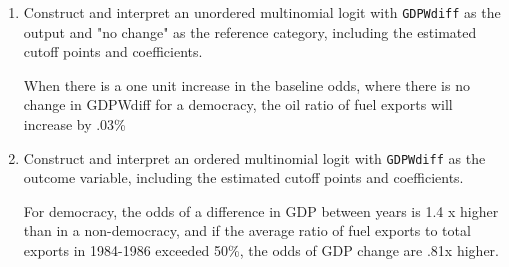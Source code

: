 \documentclass[12pt,letterpaper]{article}
\begin{document}
\begin{enumerate}
	\item Construct and interpret an unordered multinomial logit with \texttt{GDPWdiff} as the output and "no change" as the reference category, including the estimated cutoff points and coefficients.
	
	 
	When there is a one unit increase in the baseline odds, where there is no change in GDPWdiff for a democracy, the oil ratio of fuel exports will increase by .03\%

	
	\item Construct and interpret an ordered multinomial logit with \texttt{GDPWdiff} as the outcome variable, including the estimated cutoff points and coefficients.
	 
	
	For democracy, the odds of a difference in GDP between years is 1.4 x higher than in a non-democracy, and if the average ratio of fuel exports to total exports in 1984-1986 exceeded 50\%, the odds of GDP change are .81x higher.

	
\end{enumerate}
\end{document}
